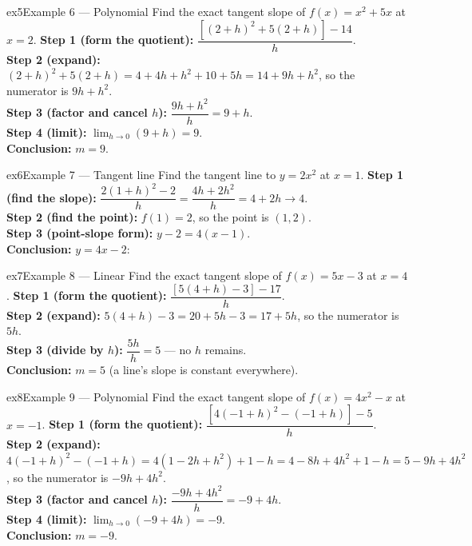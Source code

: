 \documentclass[11pt]{article}
\begin{document}
\begin{example}{ex5}{Example 6 --- Polynomial}
Find the exact tangent slope of $f(x)=x^2+5x$ at $x=2$.\soln
\textbf{Step 1 (form the quotient):} $\dfrac{[(2+h)^2+5(2+h)]-14}{h}$.\\[3pt]
\textbf{Step 2 (expand):} $(2+h)^2+5(2+h)=4+4h+h^2+10+5h=14+9h+h^2$, so the numerator is $9h+h^2$.\\[3pt]
\textbf{Step 3 (factor and cancel $h$):} $\dfrac{9h+h^2}{h}=9+h$.\\[3pt]
\textbf{Step 4 (limit):} $\lim_{h\to0}(9+h)=9$.\\[3pt]
\textbf{Conclusion:} $m=9$.
\end{example}

\begin{example}{ex6}{Example 7 --- Tangent line}
Find the tangent line to $y=2x^2$ at $x=1$.\soln
\textbf{Step 1 (find the slope):} $\dfrac{2(1+h)^2-2}{h}=\dfrac{4h+2h^2}{h}=4+2h\to4$.\\[3pt]
\textbf{Step 2 (find the point):} $f(1)=2$, so the point is $(1,2)$.\\[3pt]
\textbf{Step 3 (point-slope form):} $y-2=4(x-1)$.\\[3pt]
\textbf{Conclusion:} $y=4x-2$:
\end{example}

\begin{example}{ex7}{Example 8 --- Linear}
Find the exact tangent slope of $f(x)=5x-3$ at $x=4$.\soln
\textbf{Step 1 (form the quotient):} $\dfrac{[5(4+h)-3]-17}{h}$.\\[3pt]
\textbf{Step 2 (expand):} $5(4+h)-3=20+5h-3=17+5h$, so the numerator is $5h$.\\[3pt]
\textbf{Step 3 (divide by $h$):} $\dfrac{5h}{h}=5$ --- no $h$ remains.\\[3pt]
\textbf{Conclusion:} $m=5$ (a line's slope is constant everywhere).
\end{example}

\begin{example}{ex8}{Example 9 --- Polynomial}
Find the exact tangent slope of $f(x)=4x^2-x$ at $x=-1$.\soln
\textbf{Step 1 (form the quotient):} $\dfrac{[4(-1+h)^2-(-1+h)]-5}{h}$.\\[3pt]
\textbf{Step 2 (expand):} $4(-1+h)^2-(-1+h)=4(1-2h+h^2)+1-h=4-8h+4h^2+1-h=5-9h+4h^2$, so the numerator is $-9h+4h^2$.\\[3pt]
\textbf{Step 3 (factor and cancel $h$):} $\dfrac{-9h+4h^2}{h}=-9+4h$.\\[3pt]
\textbf{Step 4 (limit):} $\lim_{h\to0}(-9+4h)=-9$.\\[3pt]
\textbf{Conclusion:} $m=-9$.
\end{example}
\end{document}

